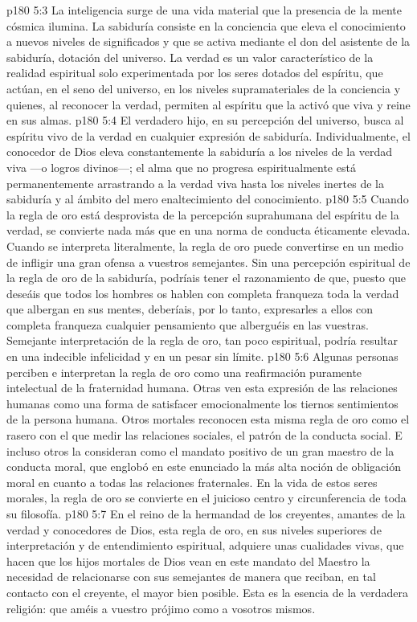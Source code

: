 \vs p180 5:3 La inteligencia surge de una vida material que la presencia de la mente cósmica ilumina. La sabiduría consiste en la conciencia que eleva el conocimiento a nuevos niveles de significados y que se activa mediante el don del asistente de la sabiduría, dotación del universo. La verdad es un valor característico de la realidad espiritual solo experimentada por los seres dotados del espíritu, que actúan, en el seno del universo, en los niveles supramateriales de la conciencia y quienes, al reconocer la verdad, permiten al espíritu que la activó que viva y reine en sus almas.
\vs p180 5:4 El verdadero hijo, en su percepción del universo, busca al espíritu vivo de la verdad en cualquier expresión de sabiduría. Individualmente, el conocedor de Dios eleva constantemente la sabiduría a los niveles de la verdad viva ---o logros divinos---; el alma que no progresa espiritualmente está permanentemente arrastrando a la verdad viva hasta los niveles inertes de la sabiduría y al ámbito del mero enaltecimiento del conocimiento.
\vs p180 5:5 Cuando la regla de oro está desprovista de la percepción suprahumana del espíritu de la verdad, se convierte nada más que en una norma de conducta éticamente elevada. Cuando se interpreta literalmente, la regla de oro puede convertirse en un medio de infligir una gran ofensa a vuestros semejantes. Sin una percepción espiritual de la regla de oro de la sabiduría, podríais tener el razonamiento de que, puesto que deseáis que todos los hombres os hablen con completa franqueza toda la verdad que albergan en sus mentes, deberíais, por lo tanto, expresarles a ellos con completa franqueza cualquier pensamiento que alberguéis en las vuestras. Semejante interpretación de la regla de oro, tan poco espiritual, podría resultar en una indecible infelicidad y en un pesar sin límite.
\vs p180 5:6 Algunas personas perciben e interpretan la regla de oro como una reafirmación puramente intelectual de la fraternidad humana. Otras ven esta expresión de las relaciones humanas como una forma de satisfacer emocionalmente los tiernos sentimientos de la persona humana. Otros mortales reconocen esta misma regla de oro como el rasero con el que medir las relaciones sociales, el patrón de la conducta social. E incluso otros la consideran como el mandato positivo de un gran maestro de la conducta moral, que englobó en este enunciado la más alta noción de obligación moral en cuanto a todas las relaciones fraternales. En la vida de estos seres morales, la regla de oro se convierte en el juicioso centro y circunferencia de toda su filosofía.
\vs p180 5:7 En el reino de la hermandad de los creyentes, amantes de la verdad y conocedores de Dios, esta regla de oro, en sus niveles superiores de interpretación y de entendimiento espiritual, adquiere unas cualidades vivas, que hacen que los hijos mortales de Dios vean en este mandato del Maestro la necesidad de relacionarse con sus semejantes de manera que reciban, en tal contacto con el creyente, el mayor bien posible. Esta es la esencia de la verdadera religión: que améis a vuestro prójimo como a vosotros mismos.
